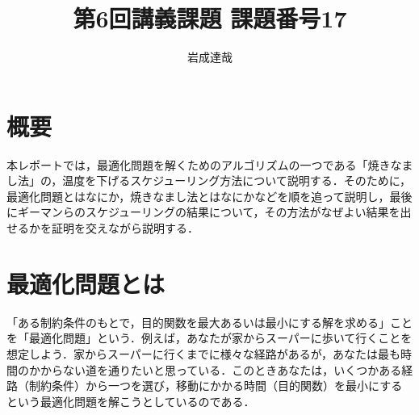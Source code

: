 \documentclass{jarticle}
\title{第6回講義課題 課題番号17}
\date{\todayd}
\author{岩成達哉}
\begin{document}
\begin{titlepage}
	\setlength{\topmargin}{1.1in}
	\vspace{100mm}
	\maketitle
\end{titlepage}

\section{概要}
本レポートでは，最適化問題を解くためのアルゴリズムの一つである「焼きなまし法」の，温度を下げるスケジューリング方法について説明する．そのために，最適化問題とはなにか，焼きなまし法とはなにかなどを順を追って説明し，最後にギーマンらのスケジューリングの結果について，その方法がなぜよい結果を出せるかを証明を交えながら説明する．

\section{最適化問題とは}
「ある制約条件のもとで，目的関数を最大あるいは最小にする解を求める」ことを「最適化問題」という．例えば，あなたが家からスーパーに歩いて行くことを想定しよう．家からスーパーに行くまでに様々な経路があるが，あなたは最も時間のかからない道を通りたいと思っている．このときあなたは，いくつかある経路（制約条件）から一つを選び，移動にかかる時間（目的関数）を最小にするという最適化問題を解こうとしているのである．%

\end{document}
